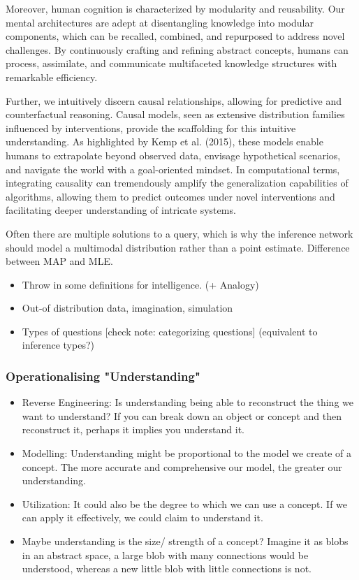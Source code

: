 Moreover, human cognition is characterized by modularity and reusability. Our mental architectures are adept at disentangling knowledge into modular components, which can be recalled, combined, and repurposed to address novel challenges.
By continuously crafting and refining abstract concepts, humans can process, assimilate, and communicate multifaceted knowledge structures with remarkable efficiency.

Further, we intuitively discern causal relationships, allowing for predictive and counterfactual reasoning.
Causal models, seen as extensive distribution families influenced by interventions, provide the scaffolding for this intuitive understanding. As highlighted by Kemp et al. (2015), these models enable humans to extrapolate beyond observed data, envisage hypothetical scenarios, and navigate the world with a goal-oriented mindset. In computational terms, integrating causality can tremendously amplify the generalization capabilities of algorithms, allowing them to predict outcomes under novel interventions and facilitating deeper understanding of intricate systems.

Often there are multiple solutions to a query, which is why the inference network should model a multimodal distribution rather than a point estimate. Difference between MAP and MLE. 

\begin{itemize}
    \item Throw in some definitions for intelligence. (+ Analogy)
    \item Out-of distribution data, imagination, simulation
    \item Types of questions [check note: categorizing questions] (equivalent to inference types?)
\end{itemize} 

\subsubsection{Operationalising "Understanding"}
\begin{itemize}
    \item Reverse Engineering: Is understanding being able to reconstruct the thing we want to understand? If you can break down an object or concept and then reconstruct it, perhaps it implies you understand it.
    \item Modelling: Understanding might be proportional to the model we create of a concept. The more accurate and comprehensive our model, the greater our understanding.
    \item Utilization: It could also be the degree to which we can use a concept. If we can apply it effectively, we could claim to understand it.
    \item Maybe understanding is the size/ strength of a concept? Imagine it as blobs in an abstract space, a large blob with many connections would be understood, whereas a new little blob with little connections is not. 
\end{itemize}

